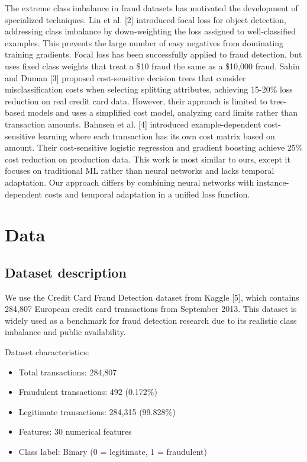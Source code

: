 \documentclass[10pt,twocolumn,letterpaper]{article}
\begin{document}
The extreme class imbalance in fraud datasets has motivated the development of specialized techniques. Lin et al. [2] introduced focal loss for object detection, addressing class imbalance by down-weighting the loss assigned to well-classified examples. This prevents the large number of easy negatives from dominating training gradients. Focal loss has been successfully applied to fraud detection, but uses fixed class weights that treat a \$10 fraud the same as a \$10,000 fraud.
Sahin and Duman [3] proposed cost-sensitive decision trees that consider misclassification costs when selecting splitting attributes, achieving 15-20\% loss reduction on real credit card data. However, their approach is limited to tree-based models and uses a simplified cost model, analyzing card limits rather than transaction amounts.
Bahnsen et al. [4] introduced example-dependent cost-sensitive learning where each transaction has its own cost matrix based on amount. Their cost-sensitive logistic regression and gradient boosting achieve 25\% cost reduction on production data. This work is most similar to ours, except it focuses on traditional ML rather than neural networks and lacks temporal adaptation.
Our approach differs by combining neural networks with instance-dependent costs and temporal adaptation in a unified loss function.

\section{Data}

\subsection{Dataset description}

We use the Credit Card Fraud Detection dataset from Kaggle [5], which contains 284,807 European credit card transactions from September 2013. This dataset is widely used as a benchmark for fraud detection research due to its realistic class imbalance and public availability.

Dataset characteristics:
\begin{itemize}
  \item Total transactions: 284,807
  \item Fraudulent transactions: 492 (0.172\%)
  \item Legitimate transactions: 284,315 (99.828\%)
  \item Features: 30 numerical features
  \item Class label: Binary (0 = legitimate, 1 = fraudulent)
\end{itemize}
\end{document}
